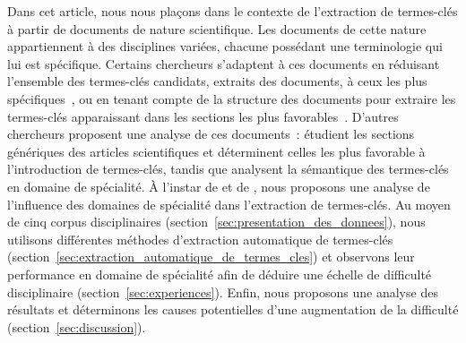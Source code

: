   Dans cet article, nous nous plaçons dans le contexte de l'extraction de
  termes-clés à partir de documents de nature scientifique. Les documents de
  cette nature appartiennent à des disciplines variées, chacune possédant une
  terminologie qui lui est spécifique. Certains chercheurs s'adaptent à ces
  documents en réduisant l'ensemble des termes-clés candidats, extraits des
  documents, à ceux les plus spécifiques~\cite{kim2009termextraction}, ou en
  tenant compte de la structure des documents pour extraire les termes-clés
  apparaissant dans les sections les plus
  favorables~\cite{hofmann2009impactofdocumentstructure}.
  D'autres chercheurs proposent une analyse de ces documents~:
   étudient les sections génériques des
  articles scientifiques et déterminent celles les plus favorable à
  l'introduction de termes-clés, tandis que
   analysent la sémantique des
  termes-clés en domaine de spécialité. À l'instar de
   et de
  ,
  nous proposons une analyse de l'influence des domaines de spécialité dans
  l'extraction de termes-clés. Au moyen de cinq corpus disciplinaires
  (section~\ref{sec:presentation_des_donnees}), nous utilisons différentes
  méthodes d'extraction automatique de termes-clés
  (section~\ref{sec:extraction_automatique_de_termes_cles}) et observons leur
  performance en domaine de spécialité afin de déduire une échelle de difficulté
  disciplinaire (section~\ref{sec:experiences}). Enfin, nous proposons une
  analyse des résultats et déterminons les causes potentielles d'une
  augmentation de la difficulté (section~\ref{sec:discussion}).

%

